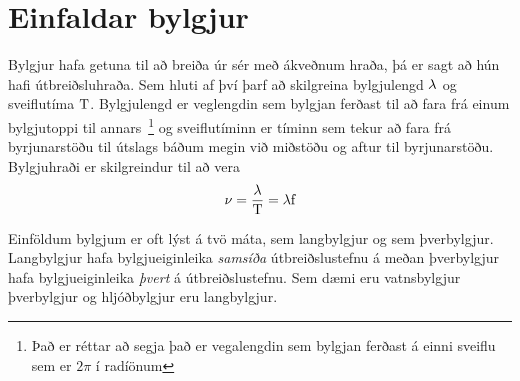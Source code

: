 \section{Einfaldar bylgjur}
Bylgjur hafa getuna til að breiða úr sér með ákveðnum hraða, þá er sagt að
hún hafi útbreiðsluhraða. Sem hluti af því þarf að skilgreina bylgjulengd $\lambda$ og
sveiflutíma $\text{T}$. Bylgjulengd er veglengdin sem bylgjan ferðast til að fara frá einum
bylgjutoppi til annars~\footnote{Það er réttar að segja það er vegalengdin
sem bylgjan ferðast á einni sveiflu sem er $2 \pi$ í radíönum} og sveiflutíminn
er tíminn sem tekur að fara frá byrjunarstöðu til útslags báðum megin við miðstöðu
og aftur til byrjunarstöðu.
Bylgjuhraði er skilgreindur til að vera
\begin{equation}
	\nu = \frac{\lambda}{\text{T}} = \lambda \text{f}
\end{equation}

%

Einföldum bylgjum er oft lýst á tvö máta, sem langbylgjur og sem þverbylgjur.
Langbylgjur hafa bylgjueiginleika \emph{samsíða} útbreiðslustefnu á meðan
þverbylgjur hafa bylgjueiginleika \emph{þvert} á útbreiðslustefnu. Sem dæmi eru
vatnsbylgjur þverbylgjur og hljóðbylgjur eru langbylgjur.
%

